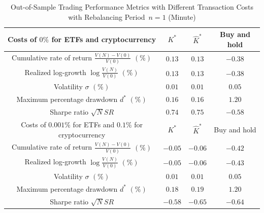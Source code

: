 \documentclass[10pt]{article} %
\begin{document}
	\medskip
	\begin{table}[h!] 
		\centering
		\caption{Out-of-Sample Trading Performance Metrics with Different Transaction Costs with Rebalancing Period~$n=1$ (Minute)} 
		\begin{tabular}{|c|c|c|c|}
			\hline 
			Costs of $0\%$  for ETFs and cryptocurrency & $K^*$ & $\widehat{K}^*$ & Buy and hold \\
			\hline
			Cumulative rate of return $\frac{V(N)-V(0)}{V(0)}$ $(\%)$ & $0.13$ & $0.13$ & $-0.38$  \\
			\hline
			Realized log-growth $\log\frac{V(N)}{V(0)}$ $(\%)$ & $0.13$ & $0.13$ & $-0.38$ \\
			\hline
			Volatility $\sigma$ $(\%)$ & $0.01$ & $0.01$ & $0.05$ \\
			\hline
			Maximum percentage drawdown $d^*$ $(\%)$ & $0.16$ & $0.16$ & $1.20$\\
			\hline
			Sharpe ratio $\sqrt{N}SR$ &  $0.74$ &  $0.75$ &  $-0.58$ \\
			\hline
			\hline
			\hline
			Costs of $0.001\%$ for ETFs and $0.1\%$ for cryptocurrency & $K^*$ & $\widehat{K}^*$ & Buy and hold \\
			\hline
			Cumulative rate of return $\frac{V(N)-V(0)}{V(0)}$ $(\%)$ & $-0.05$ & $-0.06$ & $-0.42$  \\
			\hline
			Realized log-growth $\log\frac{V(N)}{V(0)}$ $(\%)$ & $-0.05$ & $-0.06$ & $-0.43$\\
			\hline
			Volatility $\sigma$ $(\%)$ & $0.01$ & $0.01$ & $0.05$\\
			\hline
			Maximum percentage drawdown $d^*$ $(\%)$ & $0.18$ & $0.19$ & $1.20$\\
			\hline
			Sharpe ratio $\sqrt{N}SR$ &  $-0.58$ &  $-0.65$ &  $-0.64$ \\
			\hline
			\hline
		\end{tabular}
		\label{table: Descriptive Statistics}
	\end{table}
	
\end{document}
